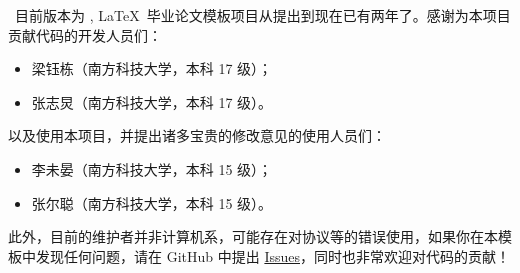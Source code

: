 \sustechthesis\ 目前版本为 \version, \LaTeX\ 毕业论文模板项目从提出到现在已有两年了。感谢为本项目贡献代码的开发人员们：
\begin{itemize}
    \item 梁钰栋（南方科技大学，本科 17 级）；
    \item 张志炅（南方科技大学，本科 17 级）。
\end{itemize}
以及使用本项目，并提出诸多宝贵的修改意见的使用人员们：
\begin{itemize}
    \item 李未晏（南方科技大学，本科 15 级）；
    \item 张尔聪（南方科技大学，本科 15 级）。
\end{itemize}

此外，目前的维护者并非计算机系，可能存在对协议等的错误使用，如果你在本模板中发现任何问题，请在 GitHub 中提出 \href{https://github.com/Iydon/sustechthesis/issues}{Issues}，同时也非常欢迎对代码的贡献！
